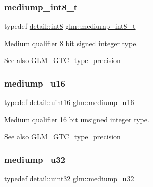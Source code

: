 \subsubsection{\texorpdfstring{mediump\+\_\+int8\+\_\+t}{mediump\_int8\_t}}
{\footnotesize\ttfamily typedef \mbox{\hyperlink{namespaceglm_1_1detail_a04b526a8d7a9b455602a0afa78c531e0}{detail\+::int8}} \mbox{\hyperlink{group__gtc__type__precision_ga626ac5f73d3538e62a879d6c56abfb36}{glm\+::mediump\+\_\+int8\+\_\+t}}}

Medium qualifier 8 bit signed integer type. \begin{DoxySeeAlso}{See also}
\mbox{\hyperlink{group__gtc__type__precision}{G\+L\+M\+\_\+\+G\+T\+C\+\_\+type\+\_\+precision}} 
\end{DoxySeeAlso}
\mbox{\label{group__gtc__type__precision_ga6745262ef6a6fdb8637b2387ef924828}} 
\subsubsection{\texorpdfstring{mediump\+\_\+u16}{mediump\_u16}}
{\footnotesize\ttfamily typedef \mbox{\hyperlink{namespaceglm_1_1detail_a47b2a7d006d187338e8031a352d1ce56}{detail\+::uint16}} \mbox{\hyperlink{group__gtc__type__precision_ga6745262ef6a6fdb8637b2387ef924828}{glm\+::mediump\+\_\+u16}}}

Medium qualifier 16 bit unsigned integer type. \begin{DoxySeeAlso}{See also}
\mbox{\hyperlink{group__gtc__type__precision}{G\+L\+M\+\_\+\+G\+T\+C\+\_\+type\+\_\+precision}} 
\end{DoxySeeAlso}
\mbox{\label{group__gtc__type__precision_gad0c27a525045c299a92306eb4cd7c13a}} 
\subsubsection{\texorpdfstring{mediump\+\_\+u32}{mediump\_u32}}
{\footnotesize\ttfamily typedef \mbox{\hyperlink{namespaceglm_1_1detail_ade6cfbf377022aaa391af8cd50489222}{detail\+::uint32}} \mbox{\hyperlink{group__gtc__type__precision_gad0c27a525045c299a92306eb4cd7c13a}{glm\+::mediump\+\_\+u32}}}

